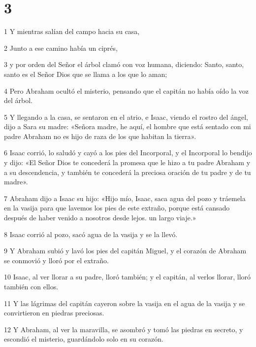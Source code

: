 \chapter{3}

\par 1 Y mientras salían del campo hacia su casa,

\par 2 Junto a ese camino había un ciprés,

\par 3 y por orden del Señor el árbol clamó con voz humana, diciendo: Santo, santo, santo es el Señor Dios que se llama a los que lo aman;

\par 4 Pero Abraham ocultó el misterio, pensando que el capitán no había oído la voz del árbol.

\par 5 Y llegando a la casa, se sentaron en el atrio, e Isaac, viendo el rostro del ángel, dijo a Sara su madre: «Señora madre, he aquí, el hombre que está sentado con mi padre Abraham no es hijo de raza de los que habitan la tierra».

\par 6 Isaac corrió, lo saludó y cayó a los pies del Incorporal, y el Incorporal lo bendijo y dijo: «El Señor Dios te concederá la promesa que le hizo a tu padre Abraham y a su descendencia, y también te concederá la preciosa oración de tu padre y de tu madre».

\par 7 Abraham dijo a Isaac su hijo: «Hijo mío, Isaac, saca agua del pozo y tráemela en la vasija para que lavemos los pies de este extraño, porque está cansado después de haber venido a nosotros desde lejos. un largo viaje.»

\par 8 Isaac corrió al pozo, sacó agua de la vasija y se la llevó.

\par 9 Y Abraham subió y lavó los pies del capitán Miguel, y el corazón de Abraham se conmovió y lloró por el extraño.

\par 10 Isaac, al ver llorar a su padre, lloró también; y el capitán, al verlos llorar, lloró también con ellos.

\par 11 Y las lágrimas del capitán cayeron sobre la vasija en el agua de la vasija y se convirtieron en piedras preciosas.

\par 12 Y Abraham, al ver la maravilla, se asombró y tomó las piedras en secreto, y escondió el misterio, guardándolo solo en su corazón.

